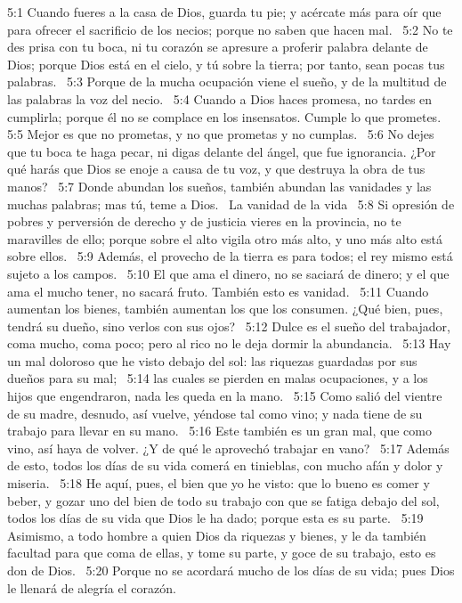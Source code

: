 5:1 Cuando fueres a la casa de Dios, guarda tu pie; y acércate más para oír que para ofrecer el sacrificio de los necios; porque no saben que hacen mal.  
5:2 No te des prisa con tu boca, ni tu corazón se apresure a proferir palabra delante de Dios; porque Dios está en el cielo, y tú sobre la tierra; por tanto, sean pocas tus palabras.  
5:3 Porque de la mucha ocupación viene el sueño, y de la multitud de las palabras la voz del necio.  
5:4 Cuando a Dios haces promesa, no tardes en cumplirla; porque él no se complace en los insensatos. Cumple lo que prometes. 
5:5 Mejor es que no prometas, y no que prometas y no cumplas.  
5:6 No dejes que tu boca te haga pecar, ni digas delante del ángel, que fue ignorancia. ¿Por qué harás que Dios se enoje a causa de tu voz, y que destruya la obra de tus manos?  
5:7 Donde abundan los sueños, también abundan las vanidades y las muchas palabras; mas tú, teme a Dios.  
La vanidad de la vida  
5:8 Si opresión de pobres y perversión de derecho y de justicia vieres en la provincia, no te maravilles de ello; porque sobre el alto vigila otro más alto, y uno más alto está sobre ellos.  
5:9 Además, el provecho de la tierra es para todos; el rey mismo está sujeto a los campos.  
5:10 El que ama el dinero, no se saciará de dinero; y el que ama el mucho tener, no sacará fruto. También esto es vanidad.  
5:11 Cuando aumentan los bienes, también aumentan los que los consumen. ¿Qué bien, pues, tendrá su dueño, sino verlos con sus ojos?  
5:12 Dulce es el sueño del trabajador, coma mucho, coma poco; pero al rico no le deja dormir la abundancia.  
5:13 Hay un mal doloroso que he visto debajo del sol: las riquezas guardadas por sus dueños para su mal;  
5:14 las cuales se pierden en malas ocupaciones, y a los hijos que engendraron, nada les queda en la mano.  
5:15 Como salió del vientre de su madre, desnudo, así vuelve, yéndose tal como vino; y nada tiene de su trabajo para llevar en su mano.  
5:16 Este también es un gran mal, que como vino, así haya de volver. ¿Y de qué le aprovechó trabajar en vano?  
5:17 Además de esto, todos los días de su vida comerá en tinieblas, con mucho afán y dolor y miseria.  
5:18 He aquí, pues, el bien que yo he visto: que lo bueno es comer y beber, y gozar uno del bien de todo su trabajo con que se fatiga debajo del sol, todos los días de su vida que Dios le ha dado; porque esta es su parte.  
5:19 Asimismo, a todo hombre a quien Dios da riquezas y bienes, y le da también facultad para que coma de ellas, y tome su parte, y goce de su trabajo, esto es don de Dios.  
5:20 Porque no se acordará mucho de los días de su vida; pues Dios le llenará de alegría el corazón.  
